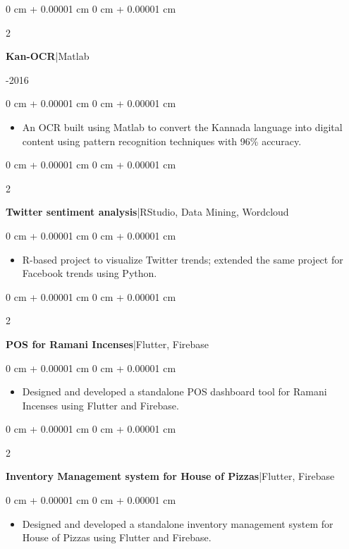 \documentclass[10pt, letterpaper]{article}
\newenvironment{highlights}{
    \begin{itemize}[
        topsep=0.10 cm,
        parsep=0.10 cm,
        partopsep=0pt,
        itemsep=0pt,
        leftmargin=0 cm + 10pt
    ]
}{
    \end{itemize}
} %
\newenvironment{onecolentry}{
    \begin{adjustwidth}{
        0 cm + 0.00001 cm
    }{
        0 cm + 0.00001 cm
    }
}{
    \end{adjustwidth}
} %
\newenvironment{twocolentry}[2][]{
    \onecolentry
    \def\secondColumn{#2}
    \setcolumnwidth{\fill, 4.5 cm}
    \begin{paracol}{2}
}{
    \switchcolumn \raggedleft \secondColumn
    \end{paracol}
    \endonecolentry
} %
\begin{document}
        \vspace{0.2 cm}

        \begin{twocolentry}{2012-2016}
            \textbf{Kan-OCR}|Matlab
        \end{twocolentry}
        \begin{onecolentry}
          \begin{highlights}
              \item An OCR built using Matlab to convert the Kannada language into digital content using pattern recognition techniques with 96\% accuracy.
            \end{highlights}
        \end{onecolentry}

        \vspace{0.2 cm}

        \begin{twocolentry}{2016}
           \textbf{Twitter sentiment analysis}|RStudio, Data Mining, Wordcloud
        \end{twocolentry}
        \begin{onecolentry}
            \begin{highlights}
               \item R-based project to visualize Twitter trends; extended the same project for Facebook trends using Python.
         \end{highlights}
        \end{onecolentry}

        \vspace{0.2 cm}

        \begin{twocolentry}{}
            \textbf{POS for Ramani Incenses}|Flutter, Firebase
        \end{twocolentry}
        \begin{onecolentry}
         \begin{highlights}
                \item Designed and developed a standalone POS dashboard tool for Ramani Incenses using Flutter and Firebase.
            \end{highlights}
        \end{onecolentry}

        \vspace{0.2 cm}

        \begin{twocolentry}{}
            \textbf{Inventory Management system for House of Pizzas}|Flutter, Firebase
        \end{twocolentry}
        \begin{onecolentry}
         \begin{highlights}
                \item Designed and developed a standalone inventory management system for House of Pizzas using Flutter and Firebase.
            \end{highlights}
        \end{onecolentry}

      
\end{document}

